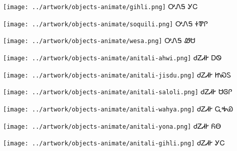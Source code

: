 \documentclass[avery5371]{flashcards}%
\begin{document}
\begin{flashcard}{
\texttt{[image: ../artwork/objects-animate/gihli.png]}
}\Huge ᎤᏁᎦ ᎩᏟ
\end{flashcard}

\begin{flashcard}{
\texttt{[image: ../artwork/objects-animate/soquili.png]}
}\Huge ᎤᏁᎦ ᏐᏈᎵ
\end{flashcard}

\begin{flashcard}{
\texttt{[image: ../artwork/objects-animate/wesa.png]}
}\Huge ᎤᏁᎦ ᏪᏌ
\end{flashcard}

\begin{flashcard}{
\texttt{[image: ../artwork/objects-animate/anitali-ahwi.png]}
}\Huge ᏧᏃᏗᎨ ᎠᏫ
\end{flashcard}

\begin{flashcard}{
\texttt{[image: ../artwork/objects-animate/anitali-jisdu.png]}
}\Huge ᏧᏃᏗᎨ ᏥᏍᏚ
\end{flashcard}

\begin{flashcard}{
\texttt{[image: ../artwork/objects-animate/anitali-saloli.png]}
}\Huge ᏧᏃᏗᎨ ᏌᎶᎵ
\end{flashcard}

\begin{flashcard}{
\texttt{[image: ../artwork/objects-animate/anitali-wahya.png]}
}\Huge ᏧᏃᏗᎨ ᏩᎭᏯ
\end{flashcard}

\begin{flashcard}{
\texttt{[image: ../artwork/objects-animate/anitali-yona.png]}
}\Huge ᏧᏃᏗᎨ ᏲᎾ
\end{flashcard}

\begin{flashcard}{
\texttt{[image: ../artwork/objects-animate/anitali-gihli.png]}
}\Huge ᏧᏃᏗᎨ ᎩᏟ
\end{flashcard}
\end{document}

